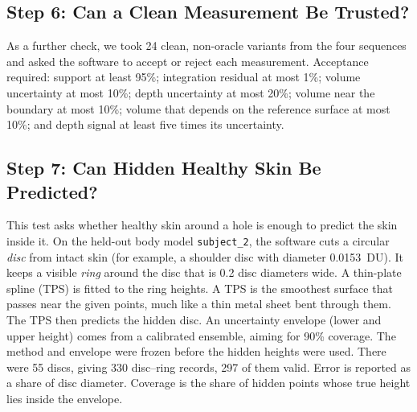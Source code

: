 \documentclass[conference]{IEEEtran}
\begin{document}
\subsection{Step 6: Can a Clean Measurement Be Trusted?}

As a further check, we took 24 clean, non-oracle variants from the four
sequences and asked the software to accept or reject each measurement.
Acceptance required: support at least 95\%; integration residual at most
1\%; volume uncertainty at most 10\%; depth uncertainty at most 20\%;
volume near the boundary at most 10\%; volume that depends on the reference
surface at most 10\%; and depth signal at least five times its
uncertainty.

\subsection{Step 7: Can Hidden Healthy Skin Be Predicted?}

This test asks whether healthy skin around a hole is enough to predict the
skin inside it. On the held-out body model \texttt{subject\_2}, the software
cuts a circular \emph{disc} from intact skin (for example, a shoulder
disc with diameter 0.0153~DU). It keeps a visible \emph{ring} around the
disc that is 0.2 disc diameters wide. A thin-plate spline (TPS) is fitted to
the ring heights. A TPS is the smoothest surface that passes near the given
points, much like a thin metal sheet bent through them. The TPS then
predicts the hidden disc. An uncertainty envelope (lower and upper height)
comes from a calibrated ensemble, aiming for 90\% coverage. The method and
envelope were frozen before the hidden heights were used. There were 55
discs, giving 330 disc--ring records, 297 of them valid. Error is reported
as a share of disc diameter. Coverage is the share of hidden points whose
true height lies inside the envelope.
\end{document}
